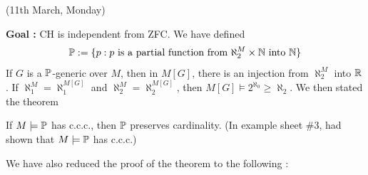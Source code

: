\documentclass[12pt,a4paper]{article}
\begin{document}
\newday

(11th March, Monday)
\s

\textbf{Goal :} CH is independent from ZFC. We have defined
\begin{align*}
\mathbb{P} := \{p : p \text{  is a partial function from } \aleph_2^M \times \mathbb{N} \text{ into }\mathbb{N}\}
\end{align*}
If $G$ is a $\mathbb{P}$-generic over $M$, then in $M[G]$, there is an injection from $\aleph_2^M$ into $\mathbb{R}$. If $\aleph_1^M = \aleph_1^{M[G]}$ and $\aleph_2^{M} = \aleph_2^{M[G]}$, then $M[G] \models 2^{\aleph_0} \geq \aleph_2$. We then stated the theorem
\s

\thm If $M\models \mathbb{P}$ has c.c.c., then $\mathbb{P}$ preserves cardinality. (In example sheet \#3, had shown that $M\models \mathbb{P}$ has c.c.c.)
\s

We have also reduced the proof of the theorem to the following :
\s
\end{document}
